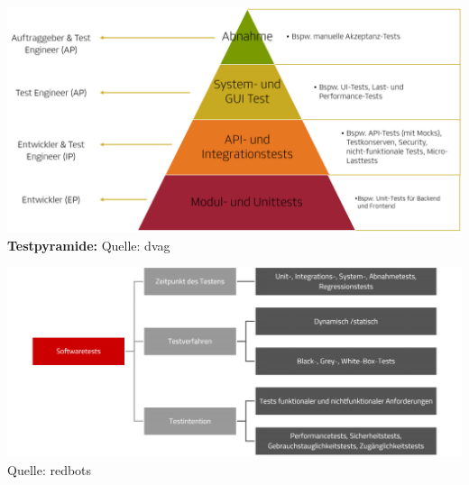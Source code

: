\begin{center}
	\includegraphics[scale=.4]{Bilder/testpyramide.png}
	\textbf{Testpyramide:} Quelle: dvag \cite{Testpyramide}
\end{center}

\begin{center}
	\includegraphics[scale=.32]{Bilder/TestsKlassifizierung.png}
	Quelle: redbots \cite{testKlassifizierung}
\end{center}

\clearpage

